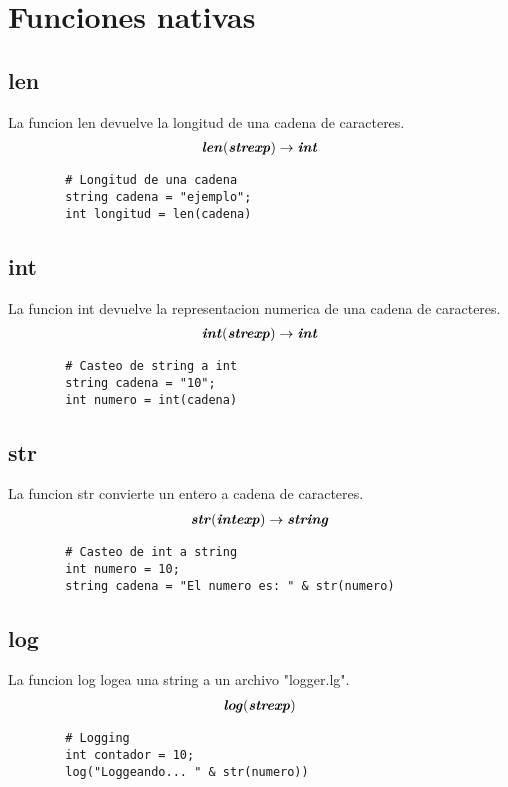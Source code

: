\documentclass{article}
\begin{document}
    \newpage
    \section{Funciones nativas}
    \subsection{len}
    La funcion len devuelve la longitud de una cadena de caracteres.
    \begin{align} 
        \textbf{\textit{len}}( \textbf{\textit{strexp}} ) \rightarrow \textbf{\textit{int}}
    \end{align}
    \begin{lstlisting}
        # Longitud de una cadena
        string cadena = "ejemplo";
        int longitud = len(cadena)
    \end{lstlisting}
    \subsection{int}
    La funcion int devuelve la representacion numerica de una cadena de caracteres.
    \begin{align} 
        \textbf{\textit{int}}( \textbf{\textit{strexp}} ) \rightarrow \textbf{\textit{int}}
    \end{align}
    \begin{lstlisting}
        # Casteo de string a int
        string cadena = "10";
        int numero = int(cadena)
    \end{lstlisting}
    \subsection{str}
    La funcion str convierte un entero a cadena de caracteres.
    \begin{align} 
        \textbf{\textit{str}} ( \textbf{\textit{intexp}} ) \rightarrow \textbf{\textit{string}}
    \end{align}
    \begin{lstlisting}
        # Casteo de int a string
        int numero = 10;
        string cadena = "El numero es: " & str(numero) 
    \end{lstlisting}
    \subsection{log}
    La funcion log logea una string a un archivo "logger.lg".
    \begin{align} 
        \textbf{\textit{log}} ( \textbf{\textit{strexp}} )
    \end{align}
    \begin{lstlisting}
        # Logging
        int contador = 10;
        log("Loggeando... " & str(numero)) 
    \end{lstlisting}
\end{document}
